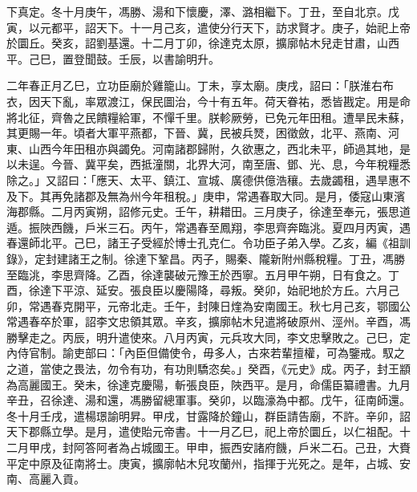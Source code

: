 \begin{pinyinscope}
下真定。冬十月庚午，馮勝、湯和下懷慶，澤、潞相繼下。丁丑，至自北京。戊寅，以元都平，詔天下。十一月己亥，遣使分行天下，訪求賢才。庚子，始祀上帝於圜丘。癸亥，詔劉基還。十二月丁卯，徐達克太原，擴廓帖木兒走甘肅，山西平。己巳，置登聞鼓。壬辰，以書諭明升。

二年春正月乙巳，立功臣廟於雞籠山。丁未，享太廟。庚戌，詔曰：「朕淮右布衣，因天下亂，率眾渡江，保民圖治，今十有五年。荷天眷祐，悉皆戡定。用是命將北征，齊魯之民饋糧給軍，不憚千里。朕軫厥勞，已免元年田租。遭旱民未蘇，其更賜一年。頃者大軍平燕都，下晉、冀，民被兵燹，困徵斂，北平、燕南、河東、山西今年田租亦與蠲免。河南諸郡歸附，久欲惠之，西北未平，師過其地，是以未逞。今晉、冀平矣，西抵潼關，北界大河，南至唐、鄧、光、息，今年稅糧悉除之。」又詔曰：「應天、太平、鎮江、宣城、廣德供億浩穰。去歲蠲租，遇旱惠不及下。其再免諸郡及無為州今年租稅。」庚申，常遇春取大同。是月，倭寇山東濱海郡縣。二月丙寅朔，詔修元史。壬午，耕耤田。三月庚子，徐達至奉元，張思道遁。振陜西饑，戶米三石。丙午，常遇春至鳳翔，李思齊奔臨洮。夏四月丙寅，遇春還師北平。己巳，諸王子受經於博士孔克仁。令功臣子弟入學。乙亥，編《祖訓錄》，定封建諸王之制。徐達下鞏昌。丙子，賜秦、隴新附州縣稅糧。丁丑，馮勝至臨洮，李思齊降。乙酉，徐達襲破元豫王於西寧。五月甲午朔，日有食之。丁酉，徐達下平涼、延安。張良臣以慶陽降，尋叛。癸卯，始祀地於方丘。六月己卯，常遇春克開平，元帝北走。壬午，封陳日煃為安南國王。秋七月己亥，鄂國公常遇春卒於軍，詔李文忠領其眾。辛亥，擴廓帖木兒遣將破原州、涇州。辛酉，馮勝擊走之。丙辰，明升遣使來。八月丙寅，元兵攻大同，李文忠擊敗之。己巳，定內侍官制。諭吏部曰：「內臣但備使令，毋多人，古來若輩擅權，可為鑒戒。馭之之道，當使之畏法，勿令有功，有功則驕恣矣。」癸酉，《元史》成。丙子，封王顓為高麗國王。癸未，徐達克慶陽，斬張良臣，陜西平。是月，命儒臣纂禮書。九月辛丑，召徐達、湯和還，馮勝留總軍事。癸卯，以臨濠為中都。戊午，征南師還。冬十月壬戌，遣楊璟諭明昇。甲戌，甘露降於鐘山，群臣請告廟，不許。辛卯，詔天下郡縣立學。是月，遣使貽元帝書。十一月乙巳，祀上帝於圜丘，以仁祖配。十二月甲戌，封阿答阿者為占城國王。甲申，振西安諸府饑，戶米二石。己丑，大賚平定中原及征南將士。庚寅，擴廓帖木兒攻蘭州，指揮于光死之。是年，占城、安南、高麗入貢。


\end{pinyinscope}
